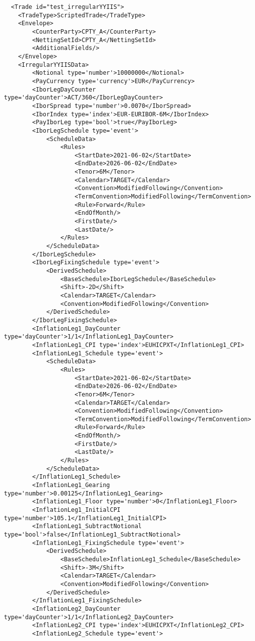 \begin{verbatim} 
  <Trade id="test_irregularYYIIS">
	<TradeType>ScriptedTrade</TradeType>
	<Envelope>
		<CounterParty>CPTY_A</CounterParty>
		<NettingSetId>CPTY_A</NettingSetId>
		<AdditionalFields/>
	</Envelope>
	<IrregularYYIISData>
		<Notional type='number'>10000000</Notional>
		<PayCurrency type='currency'>EUR</PayCurrency>
		<IborLegDayCounter type='dayCounter'>ACT/360</IborLegDayCounter>
		<IborSpread type='number'>0.0070</IborSpread>
		<IborIndex type='index'>EUR-EURIBOR-6M</IborIndex>
		<PayIborLeg type='bool'>true</PayIborLeg>
		<IborLegSchedule type='event'>
			<ScheduleData>
				<Rules>
					<StartDate>2021-06-02</StartDate>
					<EndDate>2026-06-02</EndDate>
					<Tenor>6M</Tenor>
					<Calendar>TARGET</Calendar>
					<Convention>ModifiedFollowing</Convention>
					<TermConvention>ModifiedFollowing</TermConvention>
					<Rule>Forward</Rule>
					<EndOfMonth/>
					<FirstDate/>
					<LastDate/>
				</Rules>
			</ScheduleData>
		</IborLegSchedule>
		<IborLegFixingSchedule type='event'>
			<DerivedSchedule>
				<BaseSchedule>IborLegSchedule</BaseSchedule>
				<Shift>-2D</Shift>
				<Calendar>TARGET</Calendar>
				<Convention>ModifiedFollowing</Convention>
			</DerivedSchedule>
		</IborLegFixingSchedule>
		<InflationLeg1_DayCounter type='dayCounter'>1/1</InflationLeg1_DayCounter>
		<InflationLeg1_CPI type='index'>EUHICPXT</InflationLeg1_CPI>
		<InflationLeg1_Schedule type='event'>
			<ScheduleData>
				<Rules>
					<StartDate>2021-06-02</StartDate>
					<EndDate>2026-06-02</EndDate>
					<Tenor>6M</Tenor>
					<Calendar>TARGET</Calendar>
					<Convention>ModifiedFollowing</Convention>
					<TermConvention>ModifiedFollowing</TermConvention>
					<Rule>Forward</Rule>
					<EndOfMonth/>
					<FirstDate/>
					<LastDate/>
				</Rules>
			</ScheduleData>
		</InflationLeg1_Schedule>
		<InflationLeg1_Gearing type='number'>0.00125</InflationLeg1_Gearing>
		<InflationLeg1_Floor type='number'>0</InflationLeg1_Floor>
		<InflationLeg1_InitialCPI type='number'>105.1</InflationLeg1_InitialCPI>
		<InflationLeg1_SubtractNotional type='bool'>false</InflationLeg1_SubtractNotional>
		<InflationLeg1_FixingSchedule type='event'>
			<DerivedSchedule>
				<BaseSchedule>InflationLeg1_Schedule</BaseSchedule>
				<Shift>-3M</Shift>
				<Calendar>TARGET</Calendar>
				<Convention>ModifiedFollowing</Convention>
			</DerivedSchedule>
		</InflationLeg1_FixingSchedule>
		<InflationLeg2_DayCounter type='dayCounter'>1/1</InflationLeg2_DayCounter>
		<InflationLeg2_CPI type='index'>EUHICPXT</InflationLeg2_CPI>
		<InflationLeg2_Schedule type='event'>

\end{verbatim}
